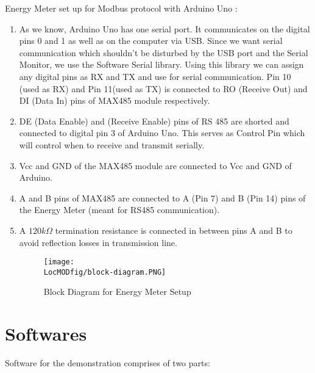 Energy Meter set up for Modbus protocol with Arduino Uno :\\
\begin{enumerate}
\item As we know, Arduino Uno has one serial port. It communicates on the digital pins 0 and 1 as well as on the computer via USB. Since we want serial communication which shouldn't be disturbed by the USB port and the Serial Monitor, we use the Software Serial library. Using this library we can assign any digital pins as RX and TX and use for serial communication. Pin 10 (used as RX) and Pin 11(used as TX) is connected to RO (Receive Out) and DI (Data In) pins of MAX485 module respectively.
\item DE (Data Enable) and  (Receive Enable) pins of RS 485 are shorted and connected to digital pin 3 of Arduino Uno. This serves as Control Pin which will control when to receive and transmit serially.
\item Vcc and GND of the MAX485 module are connected to Vcc and GND of Arduino.
\item A and B pins of MAX485 are connected to A (Pin 7) and B (Pin 14)  pins of the Energy Meter (meant for RS485 communication).
\item A $120k\Omega$  termination resistance is connected in between pins A and B to avoid reflection losses in transmission line.

\begin{figure}
\centering
\texttt{[image: \\LocMODfig/block-diagram.PNG]}
\caption{Block Diagram for Energy Meter Setup}
\label{fig:block-diagram}
\end{figure}

\end{enumerate}


\section{Softwares}

Software for the demonstration comprises of two parts:

